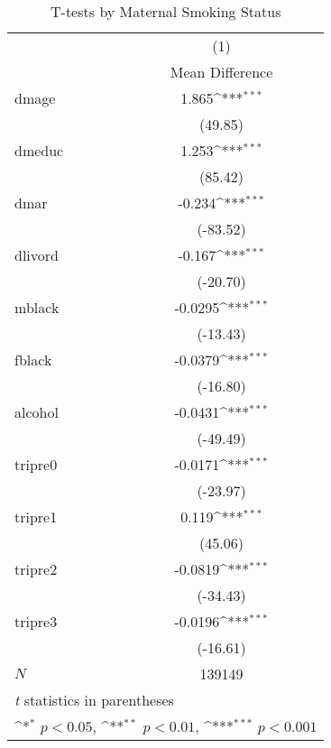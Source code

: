 \begin{table}[htbp]\centering
\def\sym#1{\ifmmode^{#1}\else\(^{#1}\)\fi}
\caption{T-tests by Maternal Smoking Status\label{a3}}
\begin{tabular}{l*{1}{c}}
\hline\hline
            &\multicolumn{1}{c}{(1)}\\
            &\multicolumn{1}{c}{Mean Difference}\\
\hline
dmage       &       1.865\sym{***}\\
            &     (49.85)         \\
[1em]
dmeduc      &       1.253\sym{***}\\
            &     (85.42)         \\
[1em]
dmar        &      -0.234\sym{***}\\
            &    (-83.52)         \\
[1em]
dlivord     &      -0.167\sym{***}\\
            &    (-20.70)         \\
[1em]
mblack      &     -0.0295\sym{***}\\
            &    (-13.43)         \\
[1em]
fblack      &     -0.0379\sym{***}\\
            &    (-16.80)         \\
[1em]
alcohol     &     -0.0431\sym{***}\\
            &    (-49.49)         \\
[1em]
tripre0     &     -0.0171\sym{***}\\
            &    (-23.97)         \\
[1em]
tripre1     &       0.119\sym{***}\\
            &     (45.06)         \\
[1em]
tripre2     &     -0.0819\sym{***}\\
            &    (-34.43)         \\
[1em]
tripre3     &     -0.0196\sym{***}\\
            &    (-16.61)         \\
\hline
\(N\)       &      139149         \\
\hline\hline
\multicolumn{2}{l}{\footnotesize \textit{t} statistics in parentheses}\\
\multicolumn{2}{l}{\footnotesize \sym{*} \(p<0.05\), \sym{**} \(p<0.01\), \sym{***} \(p<0.001\)}\\
\end{tabular}
\end{table}
